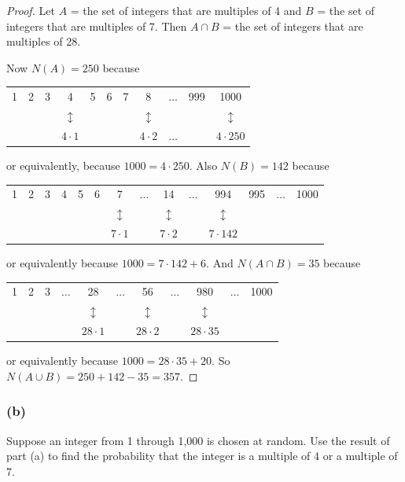 \documentclass[14pt]{extarticle}
\begin{document}
\begin{proof}
Let $A$ = the set of integers that are multiples of 4 and $B$ = the set of integers that are multiples of 7. Then 
\(A \cap B\) = the set of integers that are multiples of 28. 

Now \(N(A) = 250\) because

\begin{center}
\begin{tabular}{ccccccccccc}
1&2&3&4&5&6&7&8& \(\ldots\) &999&1000 \\
&&&\(\updownarrow\)&&&&\(\updownarrow\)&&&\(\updownarrow\) \\
&&&\(4 \cdot 1\)&&&&\(4 \cdot 2\)& \(\ldots\) &&\(4 \cdot 250\) \\
\end{tabular}
\end{center}

or equivalently, because \(1000 = 4 \cdot 250\). Also \(N(B) = 142\) because

\begin{center}
\begin{tabular}{cccccccccccccc}
1&2&3&4&5&6&7& \(\ldots\) &14& \(\ldots\) &994&995& \(\ldots\) &1000 \\
&&&&&&\(\updownarrow\)&&\(\updownarrow\)&&\(\updownarrow\)&& \\
&&&&&&\(7 \cdot 1\)&&\(7 \cdot 2\)&&\(7 \cdot 142\)&& \\
\end{tabular}
\end{center}

or equivalently because \(1000 = 7 \cdot 142 + 6\). And \(N(A \cap B) = 35\) because

\begin{center}
\begin{tabular}{ccccccccccc}
1&2&3& \(\ldots\) &28& \(\ldots\) &56& \(\ldots\) &980& \(\ldots\) &1000 \\
&&&&\(\updownarrow\)&&\(\updownarrow\)&&\(\updownarrow\)&& \\
&&&&\(28 \cdot 1\)&&\(28 \cdot 2\)&&\(28 \cdot 35\)&& \\
\end{tabular}
\end{center}

or equivalently because \(1000 = 28 \cdot 35 + 20\). So \(N(A \cup B) = 250 + 142 - 35 = 357\).
\end{proof}

\subsubsection{(b)}
Suppose an integer from 1 through 1,000 is chosen at random. Use the result of part (a) to find the probability that the integer is a multiple of 4 or a multiple of 7.
\end{document}
